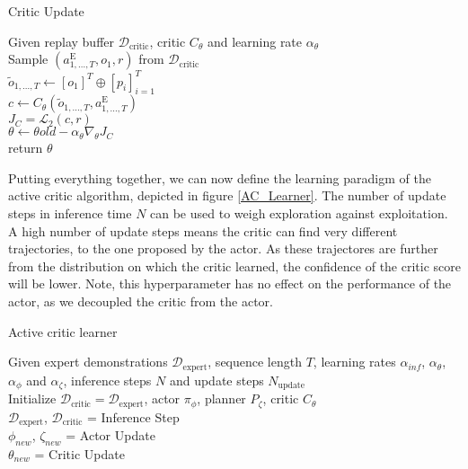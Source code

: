 \begin{algorithm}
    \caption{Critic Update}
    \label{Critic_Update_Alg}
    \begin{algorithmic}
    \Require Given replay buffer $\mathcal{D}_{\text{critic}}$, critic $C_{\theta}$ and learning rate $\alpha_{\theta}$\\
    \State Sample $(a^{\text{E}}_{1, ..., T}, o_1, r)$ from $\mathcal{D}_{\text{critic}}$\\
    \State $\tilde{o}_{1, ..., T} \gets [o_1]^T \oplus [p_i]_{i=1}^T$ \hfill{} \\
    \State $c \gets C_{\theta}(\tilde{o}_{1, ..., T}, a^{\text{E}}_{1, ..., T})$\hfill{} \\
    
    \State $J_{C} = \mathcal{L}_2(c, r)$ \hfill{} \\
    \State $\theta \gets \theta{old} - \alpha_{\theta} \nabla_{\theta}J_{C}$\\
    \State return $\theta$
\end{algorithmic}
\end{algorithm}
Putting everything together, we can now define the learning paradigm of the active critic algorithm, depicted in figure \ref{AC_Learner}. The number of update 
steps in inference time $N$ can be used to weigh exploration against exploitation. A high number of update steps means the critic can find very different 
trajectories, to the one proposed by the actor. As these trajectores are further from the distribution on which the critic learned, the confidence of the 
critic score will be lower. Note, this hyperparameter has no effect on the performance of the actor, as we decoupled the critic from the actor.
\begin{algorithm}
    \caption{Active critic learner}
    \label{AC_Learner}
    \begin{algorithmic}
    \Require Given expert demonstrations $\mathcal{D}_{\text{expert}}$, sequence length $T$, learning rates $\alpha_{inf}$, $\alpha_{\theta}$, 
    $\alpha_{\phi}$ and $\alpha_{\zeta}$, inference steps $N$ and update steps $N_{\text{update}}$\\
    \State Initialize  $\mathcal{D}_{\text{critic}} = \mathcal{D}_{\text{expert}}$, 
    actor $\pi_{\phi}$, planner $P_{\zeta}$, critic $C_{\theta}$\\
    {
        {
           $\mathcal{D}_{\text{expert}}$, $\mathcal{D}_{\text{critic}}$ = Inference Step \hfill{}\\
        }
        {
            $\phi_{new}$, $\zeta_{new}$ = Actor Update \hfill{}\\
            $\theta_{new}$ = Critic Update \hfill{}\\
        }
    }
    \end{algorithmic}
\end{algorithm}

